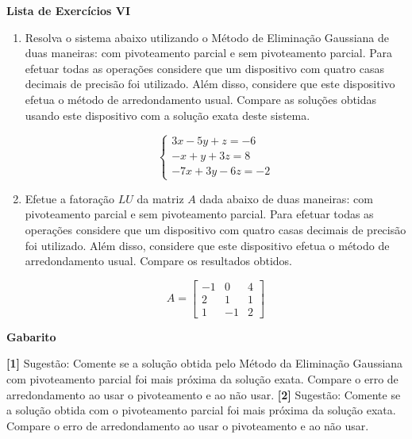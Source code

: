 \documentclass[12pt,a4paper]{article}
\begin{document}
\begin{center}
 \textbf{Lista de Exercícios VI}
\end{center}

% 

\begin{enumerate}
  
  \item Resolva o sistema abaixo utilizando o Método de Eliminação Gaussiana de duas maneiras: com pivoteamento parcial e sem pivoteamento parcial. Para efetuar todas as operações considere que um dispositivo 
com quatro casas decimais de precisão foi utilizado. Além disso, considere que este dispositivo efetua o método de arredondamento usual. Compare as 
soluções obtidas usando este dispositivo com a solução exata deste sistema.

  $$%
   \begin{cases}
    3x - 5y + z = -6 \\
    -x + y + 3z = 8 \\
    -7x + 3y - 6z = -2
   \end{cases}
  $$

  \item Efetue a fatoração $LU$ da matriz $A$ dada abaixo de duas maneiras: com pivoteamento parcial e sem pivoteamento parcial. 
Para efetuar todas as operações considere que um dispositivo com quatro casas decimais de precisão foi utilizado. 
Além disso, considere que este dispositivo efetua o método de arredondamento usual. Compare os resultados obtidos.

$$A =
\begin{bmatrix}
-1 & 0 & 4 \\
 2 & 1 & 1 \\
 1 & -1 &  2
\end{bmatrix}
$$
\end{enumerate}

\begin{center}
\textbf{Gabarito}
\end{center} 
\textbf{[1]} Sugestão: Comente se a solução obtida pelo Método da Eliminação Gaussiana com pivoteamento parcial foi mais próxima da solução exata. 
Compare o erro de arredondamento ao usar o pivoteamento e ao não usar.
\textbf{[2]} Sugestão: Comente se a solução obtida com o pivoteamento parcial foi mais próxima da solução exata. 
Compare o erro de arredondamento ao usar o pivoteamento e ao não usar.
\end{document}
